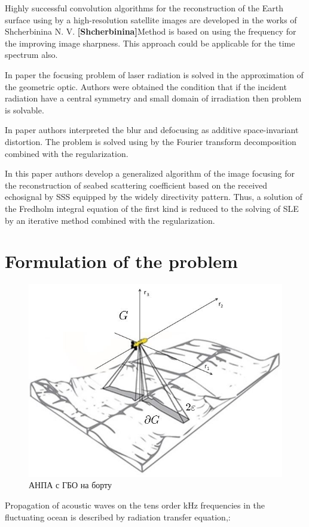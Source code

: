 \documentclass{procDDs}
\begin{document}
Highly successful convolution algorithms for the reconstruction of  the Earth surface  using by a high-resolution satellite images are developed in the works of Shcherbinina N. V. \textbf{ [Shcherbinina]}Method is based on using the frequency for the improving image sharpness. This approach could be applicable for the time spectrum also.  

In paper \cite{p2} the focusing problem of laser radiation is solved in the approximation of the geometric optic. Authors were obtained the condition that if the incident radiation have a central symmetry and small domain of irradiation then problem is solvable.

In paper \cite{p3} authors interpreted the blur and defocusing as additive space-invariant distortion. The problem is solved using by the Fourier transform decomposition combined with the regularization.

In this paper authors develop a generalized algorithm of the image focusing for the reconstruction of seabed scattering coefficient based on the received echosignal by SSS equipped by the widely directivity pattern. Thus, a solution of the Fredholm integral equation of the first kind is reduced to the solving of SLE by an iterative method combined with the regularization.

\section{Formulation of the problem}
\begin{figure}[h!]\center
	
	\includegraphics[width=1\linewidth]{img/gbo.jpg}
	\caption{АНПА с ГБО на борту}
	\label{ris:gbo}
\end{figure}
Propagation of acoustic waves on the tens order kHz frequencies in the fluctuating ocean is described by radiation
transfer equation\cite{p11},\cite{p12}:
\end{document}

